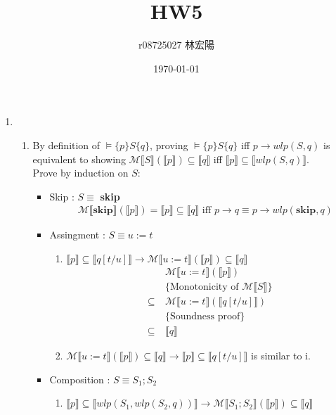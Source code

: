 \documentclass[11pt]{article}
\title{HW5}
\author{r08725027 林宏陽}
\date{\today}
\begin{document}
	\maketitle
	\begin{enumerate}
	\item 
		\begin{enumerate}
			\item By definition of $\models \{p\}S\{q\}$, proving $\models \{p\}S\{q\}$ iff $p \to wlp(S,q)$ is equivalent to showing $\mathcal{M}\llbracket S \rrbracket(\llbracket p \rrbracket) \subseteq \llbracket q \rrbracket$ iff $\llbracket p \rrbracket \subseteq \llbracket wlp(S, q) \rrbracket$.\\
			Prove by induction on $S$:
			\begin{itemize}
				\item Skip : $S\equiv$ \textbf{skip}
					\begin{align*}
						& \mathcal{M}\llbracket \textbf{skip} \rrbracket(\llbracket p \rrbracket) = \llbracket p \rrbracket \subseteq \llbracket q \rrbracket \text{ iff }  p \to q \equiv p \to wlp(\textbf{skip},q) 
					\end{align*}
				\item Assingment : $S\equiv u:=t$
				\begin{enumerate}
					\item $\llbracket p \rrbracket \subseteq \llbracket q[t/u] \rrbracket \to \mathcal{M}\llbracket u:=t \rrbracket(\llbracket p \rrbracket) \subseteq \llbracket q \rrbracket$
					\begin{align*}
						& \mathcal{M}\llbracket u:=t \rrbracket(\llbracket p \rrbracket)\\
						&\{\text{Monotonicity of $\mathcal{M}\llbracket S \rrbracket$}\}\\
						\subseteq~ & \mathcal{M}\llbracket u:=t \rrbracket(\llbracket q[t/u] \rrbracket)\\
						&\{\text{Soundness proof}\}\\
						\subseteq~ & \llbracket q \rrbracket
					\end{align*}
					\item $\mathcal{M}\llbracket u:=t \rrbracket(\llbracket p \rrbracket) \subseteq \llbracket q \rrbracket \to \llbracket p \rrbracket \subseteq \llbracket q[t/u] \rrbracket$ is similar to i.
				\end{enumerate}
				\item Composition : $S\equiv S_{1};S_{2}$
				\begin{enumerate}
					\item $\llbracket p \rrbracket \subseteq \llbracket wlp(S_{1}, wlp(S_{2}, q)) \rrbracket \to \mathcal{M} \llbracket S_{1};S_{2} \rrbracket(\llbracket p \rrbracket) \subseteq \llbracket q \rrbracket$

\end{enumerate}
\end{itemize}
\end{enumerate}
\end{enumerate}
\end{document}
